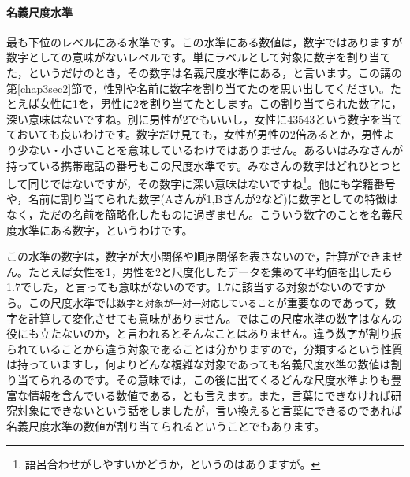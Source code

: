 \documentclass{ltjsbook}
\begin{document}
\paragraph{名義尺度水準}
最も下位のレベルにある水準です。この水準にある数値は，数字ではありますが数字としての意味がないレベルです。単にラベルとして対象に数字を割り当てた，というだけのとき，その数字は名義尺度水準にある，と言います。この講の第\ref{chap3sec2}節で，性別や名前に数字を割り当てたのを思い出してください。たとえば女性に1を，男性に2を割り当てたとします。この割り当てられた数字に，深い意味はないですね。別に男性が2でもいいし，女性に43543という数字を当てておいても良いわけです。数字だけ見ても，女性が男性の2倍あるとか，男性より少ない・小さいことを意味しているわけではありません。あるいはみなさんが持っている携帯電話の番号もこの尺度水準です。みなさんの数字はどれひとつとして同じではないですが，その数字に深い意味はないですね\footnote{語呂合わせがしやすいかどうか，というのはありますが。}。他にも学籍番号や，名前に割り当てられた数字(Aさんが1,Bさんが2など)に数字としての特徴はなく，ただの名前を簡略化したものに過ぎません。こういう数字のことを名義尺度水準にある数字，というわけです。

この水準の数字は，数字が大小関係や順序関係を表さないので，計算ができません。たとえば女性を1，男性を2と尺度化したデータを集めて平均値を出したら1.7でした，と言っても意味がないのです。1.7に該当する対象がないのですから。この尺度水準では\texttt{数字と対象が一対一対応していること}が重要なのであって，数字を計算して変化させても意味がありません。ではこの尺度水準の数字はなんの役にも立たないのか，と言われるとそんなことはありません。違う数字が割り振られていることから違う対象であることは分かりますので，分類するという性質は持っていますし，何よりどんな複雑な対象であっても名義尺度水準の数値は割り当てられるのです。その意味では，この後に出てくるどんな尺度水準よりも豊富な情報を含んでいる数値である，とも言えます。また，言葉にできなければ研究対象にできないという話をしましたが，言い換えると言葉にできるのであれば名義尺度水準の数値が割り当てられるということでもあります。
\end{document}
